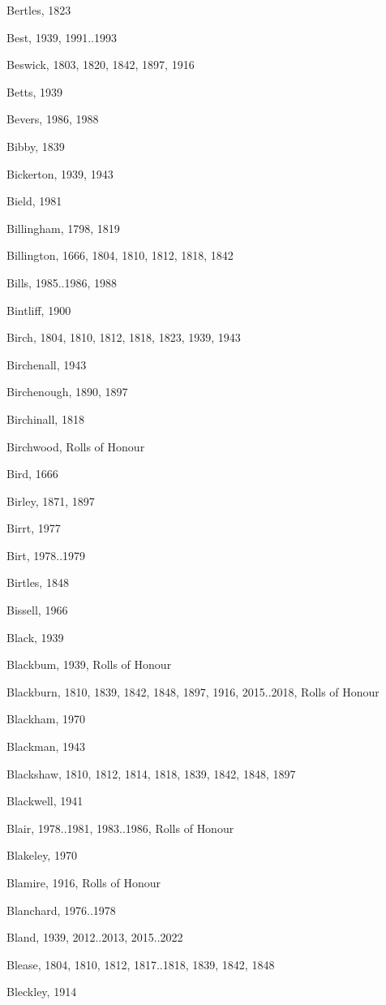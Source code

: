 {\begin{theindex}
\item Bertles, 1823
\item Best, 1939, 1991..1993
\item Beswick, 1803, 1820, 1842, 1897, 1916
\item Betts, 1939
\item Bevers, 1986, 1988
\item Bibby, 1839
\item Bickerton, 1939, 1943
\item Bield, 1981
\item Billingham, 1798, 1819
\item Billington, 1666, 1804, 1810, 1812, 1818, 1842
\item Bills, 1985..1986, 1988
\item Bintliff, 1900
\item Birch, 1804, 1810, 1812, 1818, 1823, 1939, 1943
\item Birchenall, 1943
\item Birchenough, 1890, 1897
\item Birchinall, 1818
\item Birchwood, Rolls of Honour
\item Bird, 1666
\item Birley, 1871, 1897
\item Birrt, 1977
\item Birt, 1978..1979
\item Birtles, 1848
\item Bissell, 1966
\item Black, 1939
\item Blackbum, 1939, Rolls of Honour
\item Blackburn, 1810, 1839, 1842, 1848, 1897, 1916, 2015..2018, Rolls of Honour
\item Blackham, 1970
\item Blackman, 1943
\item Blackshaw, 1810, 1812, 1814, 1818, 1839, 1842, 1848, 1897
\item Blackwell, 1941
\item Blair, 1978..1981, 1983..1986, Rolls of Honour
\item Blakeley, 1970
\item Blamire, 1916, Rolls of Honour
\item Blanchard, 1976..1978
\item Bland, 1939, 2012..2013, 2015..2022
\item Blease, 1804, 1810, 1812, 1817..1818, 1839, 1842, 1848
\item Bleckley, 1914

\end{theindex}}
